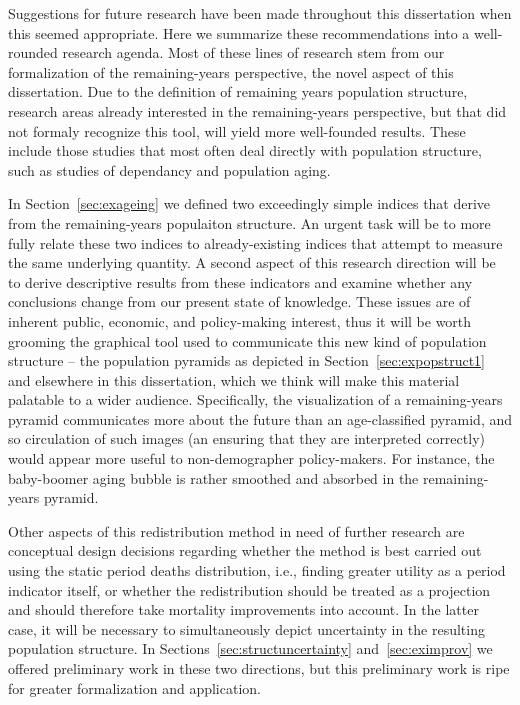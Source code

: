 Suggestions for future research have been made throughout this dissertation when
this seemed appropriate. Here we summarize these recommendations into a
well-rounded research agenda. Most of these lines of research stem
from our formalization of the remaining-years perspective, the novel aspect of
this dissertation. Due to the definition of remaining years population
structure, research areas already interested in the remaining-years perspective,
but that did not formaly recognize this tool, will yield more well-founded
results. These include those studies that most often deal directly with
population structure, such as studies of dependancy and population aging. 

In Section~\ref{sec:exageing} we defined two exceedingly simple indices
that derive from the remaining-years populaiton structure. An urgent task will
be to more fully relate these two indices to already-existing indices that
attempt to measure the same underlying quantity. A second aspect of this
research direction will be to derive descriptive results from these indicators
and examine whether any conclusions change from our present state of knowledge.
These issues are of inherent public, economic, and policy-making interest, thus
it will be worth grooming the graphical tool used to communicate this new kind
of population structure -- the population pyramids as depicted in
Section~\ref{sec:expopstruct1} and elsewhere in this dissertation, which we
think will make this material palatable to a wider audience. Specifically, the
visualization of a remaining-years pyramid communicates more about the future
than an age-classified pyramid, and so circulation of such images (an ensuring
that they are interpreted correctly) would appear more useful to non-demographer
policy-makers. For instance, the baby-boomer aging bubble is rather smoothed and
absorbed in the remaining-years pyramid. 

Other aspects of this redistribution method in need of further research are
conceptual design decisions regarding whether the method is best carried out
using the static period deaths distribution, i.e., finding greater utility as a
period indicator itself, or whether the redistribution should be treated as a
 projection and should therefore take mortality improvements into account.
In the latter case, it will be necessary to simultaneously depict uncertainty in
the resulting population structure. In
Sections~\ref{sec:structuncertainty} and~\ref{sec:eximprov} we offered
preliminary work in these two directions, but this preliminary work is ripe for
greater formalization and application.

